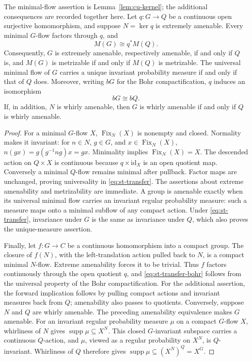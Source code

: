 \begin{proposition}\label{prop:st-transfer}
 The minimal-flow assertion is Lemma~\ref{lem:cu-kernel}; the additional consequences are recorded together here. Let $q:G\to Q$ be a continuous open surjective
homomorphism, and suppose $N=\ker q$ is extremely amenable. Every minimal $G$-flow factors through $q$, and 
\begin{equation}  \label{eq:st-transfer}
M(G)\cong q^*M(Q).
\end{equation}
Consequently, $G$ is extremely amenable, respectively amenable, if and only
if $Q$ is, and $M(G)$ is metrizable if and only if $M(Q)$ is metrizable. The
universal minimal flow of $G$ carries a unique invariant probability measure
if and only if that of $Q$ does. Moreover, writing $bG$ for the Bohr
compactification, $q$ induces an isomorphism 
\begin{equation}  \label{eq:st-transfer-bohr}
bG\cong bQ.
\end{equation}
If, in addition, $N$ is whirly amenable, then $G$ is whirly amenable if and
only if $Q$ is whirly amenable.
\end{proposition}

\begin{proof}
For a minimal $G$-flow $X$, $\operatorname{Fix}_N(X)$ is nonempty and closed. Normality
makes it invariant: for $n\in N$, $g\in G$, and $x\in\operatorname{Fix}_N(X)$, $n(gx)=g(g^{-1}ng)x=gx$. Minimality implies $\operatorname{Fix}_N(X)=X$. The descended
action on $Q\times X$ is continuous because $q\times\mathrm{id}_X$ is an
open quotient map. Conversely a minimal $Q$-flow remains minimal after
pullback. Factor maps are unchanged, proving universality in \eqref{eq:st-transfer}. The assertions about extreme amenability and
metrizability are immediate. A group is amenable exactly when its universal
minimal flow carries an invariant regular probability measure: such a
measure maps onto a minimal subflow of any compact action. Under \eqref{eq:st-transfer}, invariance under $G$ is the same as invariance under $Q$, which also proves the unique-measure assertion.

Finally, let $f:G\to C$ be a continuous homomorphism into a compact group.
The closure of $f(N)$, with the left-translation action pulled back to $N$,
is a compact minimal $N$-flow. Extreme amenability forces it to be trivial.
Thus $f$ factors continuously through the open quotient $q$, and \eqref{eq:st-transfer-bohr} follows from the universal property of the Bohr
compactification.
For the additional assertion, the forward implication follows by pulling
compact actions and invariant measures back from $Q$; amenability also
passes to quotients. Conversely, suppose $N$ and $Q$ are whirly amenable.
The preceding amenability equivalence makes $G$ amenable. For an invariant
regular probability measure $\mu$ on a compact $G$-flow $X$, whirliness of
$N$ gives $\operatorname{supp}\mu\subseteq X^N$. This closed $G$-invariant subspace
carries a continuous $Q$-action, and $\mu$, viewed as a regular probability
on $X^N$, is $Q$-invariant. Whirliness of $Q$ therefore gives
$\operatorname{supp}\mu\subseteq (X^N)^Q=X^G$.
\end{proof}

